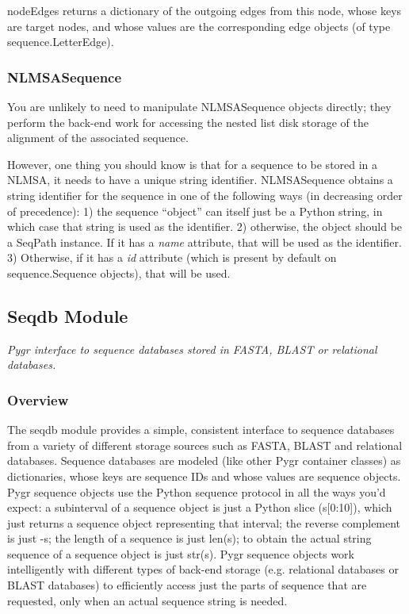 \documentclass{howto}
\begin{document}
\begin{funcdesc}{nodeEdges}{}
  returns a dictionary of the outgoing edges
  from this node, whose keys are target nodes, and whose values
  are the corresponding edge objects (of type sequence.LetterEdge).
\end{funcdesc}


\subsubsection{NLMSASequence}
You are unlikely to need to manipulate NLMSASequence objects directly;
they perform the back-end work for accessing the nested list disk storage
of the alignment of the associated sequence.

However, one thing you should know is that for a sequence to be stored
in a NLMSA, it needs to have a unique string identifier.
NLMSASequence obtains a string identifier for the sequence in one of the following
ways (in decreasing order of precedence): 1) the sequence ``object'' can itself just
be a Python string, in which case that string is used as the identifier. 2) otherwise,
the object should be a SeqPath instance.  If it has a {\em name} attribute, that will
be used as the identifier. 3) Otherwise, if it has a {\em id} attribute (which is present
by default on sequence.Sequence objects), that will be used.




\subsection{Seqdb Module}
\label{seqdb}

{\em Pygr interface to sequence databases stored in FASTA, BLAST or relational databases.}


\subsubsection{Overview}

The seqdb module provides a simple, consistent interface to sequence databases from a variety of different storage sources such as FASTA, BLAST and relational databases.  Sequence databases are modeled (like other Pygr container classes) as dictionaries, whose keys are sequence IDs and whose values are sequence objects.  Pygr sequence objects use the Python sequence protocol in all the ways you'd expect: a subinterval of a sequence object is just a Python slice (s[0:10]), which just returns a sequence object representing that interval; the reverse complement is just -s; the length of a sequence is just len(s); to obtain the actual string sequence of a sequence object is just str(s).  Pygr sequence objects work intelligently with different types of back-end storage (e.g. relational databases or BLAST databases) to efficiently access just the parts of sequence that are requested, only when an actual sequence string is needed.
\end{document}
